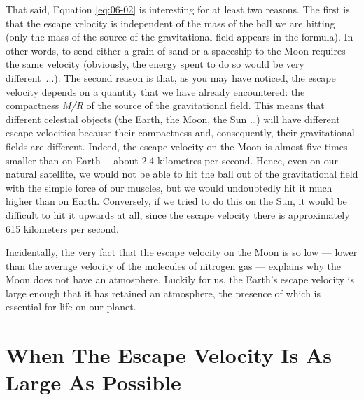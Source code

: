 That said, Equation \eqref{eq:06-02} is interesting for at least two reasons. The first is that the
escape velocity is independent of the mass of the ball we are hitting (only the mass of
the source of the gravitational field appears in the formula). In other words, to send
either a grain of sand or a spaceship to the Moon requires the same
velocity (obviously, the energy spent to do so would be very different~...). The second
reason is that, as you may have noticed, the escape velocity depends on a quantity that
we have already encountered: the compactness \emph{M/R} of the source of the
gravitational field. This means that different celestial objects (the Earth, the Moon,
the Sun \ldots) will have different escape velocities because their
compactness and, consequently, their gravitational fields are different. Indeed, the
escape velocity on the Moon is almost five times smaller than on Earth ---about 2.4
kilometres per second. Hence, even on our natural satellite, we would not be able to hit
the ball out of the gravitational field with the simple force of our muscles, but we
would undoubtedly hit it much higher than on Earth. Conversely, if we tried to do this
on the Sun, it would be difficult to hit it upwards at all, since the escape velocity
there is approximately 615 kilometers per second.

Incidentally, the very fact that the escape velocity on the Moon is so
low --- lower than the average velocity of the molecules of nitrogen gas --- explains
why the Moon does not have an atmosphere. Luckily for us, the Earth's escape velocity is
large enough that it has retained an atmosphere, the presence of which is essential for
life on our planet.

\section{When The Escape Velocity Is As Large As Possible}\label{sec:06-light}

